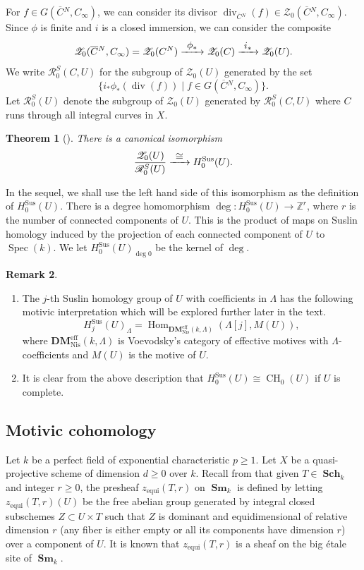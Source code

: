 \documentclass[11pt]{article}
\newcommand{\skpt}{\smallskip}
\numberwithin{equation}{section}
\let\mathcal\mathscr
\let\sep\mid
\def\To#1{\mathchoice{\xrightarrow{\textstyle\kern4pt#1\kern3pt}}{\stackrel{#1}{\longrightarrow}}{}{}}
\newcommand{\equi}{\mathrm{equi}}
\newcommand{\sus}{\mathrm{Sus}}
\newtheorem{thm}{Theorem}[section]
\theoremstyle{definition}
\newtheorem{remk}[thm]{Remark}
\newcommand{\sR}{{\mathcal R}}
\newcommand{\sZ}{{\mathcal Z}}
\newcommand{\Z}{{\mathbb Z}}
\DeclareMathOperator{\CH}{CH}
\DeclareMathOperator{\divf}{div}
\DeclareMathOperator{\Hom}{Hom}
\DeclareMathOperator{\Sch}{\mathbf{Sch}}
\DeclareMathOperator{\Sm}{\mathbf{Sm}}
\DeclareMathOperator{\Spec}{Spec}
\newcommand{\eff}{\mathrm{eff}}
\newcommand{\Nis}{\mathrm{Nis}}
\let\ov\overline
\let\ol\ov
\begin{document}
For $f\in G(\ol{C}{}^N, C_\infty)$, we can consider its divisor $\divf_{\ol{C}{}^N}(f)\in \sZ_0(\ol{C}{}^N, C_\infty)$. Since $\phi$ is finite and $i$ is a closed immersion, we can consider the composite\vspace*{-3pt}
\[ \sZ_0(\ol{C}{}^N, C_\infty) = \sZ_0(C^N) \To{\phi_*} \sZ_0(C) \To{i_*} \sZ_0(U). \]
We write $\sR^{S}_0(C, U)$ for the subgroup of $\sZ_0(U)$ generated by the set
\[
\{ i_*\phi_* (\divf(f)) \sep f\in G(\ol{C}{}^N, C_\infty)\}.
\]
Let $\sR^S_0(U)$ denote the subgroup of $\sZ_0(U)$ generated by $\sR^{S}_0(C, U)$ where $C$ runs through all integral curves in $X$.

\begin{thm}[{\cite[Th.\,5.1]{Schmidt-1}}]\label{thm:suslinhomology}
There is a canonical isomorphism
\[
\frac{\sZ_0(U)}{\sR_0^S(U)} \To{\cong} H^{\sus}_0(U).
\]
\end{thm}

In the sequel, we shall use the left hand side of this isomorphism as the
definition of $H^{\sus}_0(U)$. There is a
degree homomorphism $\deg \colon H^{\sus}_0(U) \to \Z^r$, where
$r$ is the number of connected components of $U$. This is the product of
maps on Suslin homology induced by the projection of each connected
component of $U$ to $\Spec(k)$. We let
$H^{\sus}_0(U)_{\deg 0}$ be the kernel of $\deg$.

\skpt
\begin{remk}\label{remk:mot-homology-DM}
\begin{enumerate}
\item
The $j$-th Suslin homology group of $U$ with coefficients in $\Lambda$
has the following motivic interpretation which will be explored further later in the
text.
\[ H_j^{\sus}(U)_{\Lambda} = \Hom_{\mathbf{DM}^{\eff}_{\Nis}(k, \Lambda)}(\Lambda[j], M(U)),
\]
where $\mathbf{DM}^{\eff}_{\Nis}(k, \Lambda)$ is Voevodsky's category of effective
motives with $\Lambda$-coefficients and $M(U)$ is the motive
of $U$.

\item
It is clear from the above description that
$H_0^{\sus}(U) \cong \CH_0(U)$ if $U$ is complete.
\end{enumerate}
\end{remk}

\subsection{Motivic cohomology}
\label{sec:LW-mot-coh}Let $k$ be a perfect
field of exponential characteristic $p \ge 1$.
Let $X$ be a quasi-projective scheme of dimension $d \ge 0$ over $k$.
Recall from \cite[Lect.\,16]{MVW} that given $T \in \Sch_k$ and integer
$r \ge 0$, the presheaf $z_{\equi}(T,r)$ on $\Sm_k$ is defined by
letting $z_{\equi}(T,r)(U)$ be the free abelian group generated by
integral closed subschemes $Z \subset U \times T$ such that $Z$ is dominant and
equidimensional of relative dimension $r$ (any fiber is either empty or all
its components have dimension $r$) over a component of $U$.
It is known that $z_{\equi}(T,r)$ is a sheaf on the big étale site of $\Sm_k$.
\end{document}

